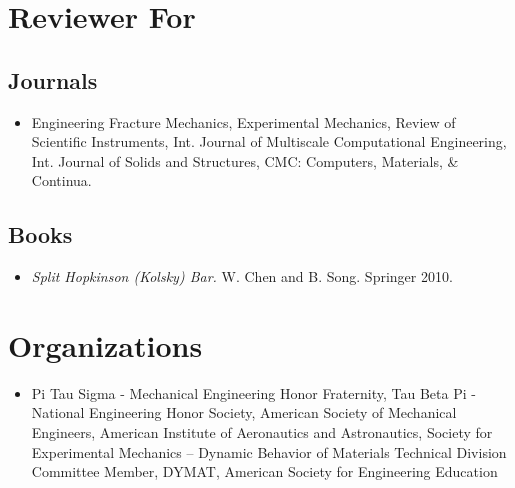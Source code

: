 \section*{Reviewer For}

\subsection*{Journals}

\begin{itemize}
    \item Engineering Fracture Mechanics, Experimental Mechanics,  Review of Scientific Instruments, Int. Journal of Multiscale Computational Engineering, Int. Journal of Solids and Structures, CMC: Computers, Materials, \& Continua.
\end{itemize}

\subsection*{Books}

\begin{itemize}
    \item {\it Split Hopkinson (Kolsky) Bar.}  W. Chen and B. Song.  Springer 2010.
\end{itemize}

\section*{Organizations}

\begin{itemize}
    \item Pi Tau Sigma - Mechanical Engineering Honor Fraternity, Tau Beta Pi - National Engineering Honor Society, American Society of Mechanical Engineers, American Institute of Aeronautics and Astronautics, Society for Experimental Mechanics -- Dynamic Behavior of Materials Technical Division Committee Member, DYMAT, American Society for Engineering Education
\end{itemize}

